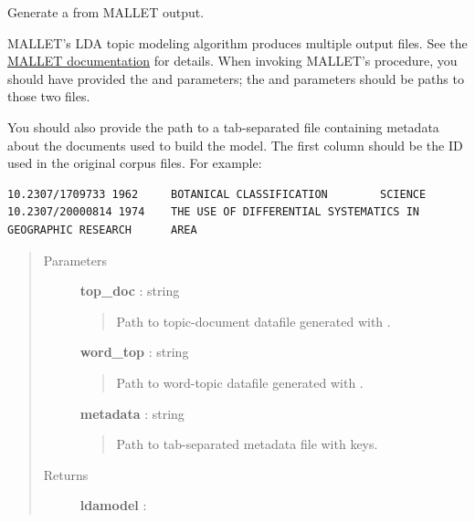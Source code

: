 \documentclass[letterpaper,10pt,english]{sphinxmanual}
\begin{document}
\begin{fulllineitems}
\label{tethne.model.corpus.ldamodel:tethne.model.corpus.ldamodel.from_mallet}
Generate a {\hyperref[tethne.model.corpus.ldamodel:tethne.model.corpus.ldamodel.LDAModel]{}} from MALLET output.

MALLET's LDA topic modeling algorithm produces multiple output files. See
the \href{http://mallet.cs.umass.edu/topics.php}{MALLET documentation} for
details. When invoking MALLET's  procedure, you should
have provided the  and 
parameters; the  and  parameters should be paths
to those two files.

You should also provide the path  to a tab-separated file 
containing metadata about the documents used to build the model. The first
column should be the ID used in the original corpus files. For example:

\begin{Verbatim}[commandchars=\\\{\}]
10.2307/1709733 1962     BOTANICAL CLASSIFICATION        SCIENCE
10.2307/20000814 1974    THE USE OF DIFFERENTIAL SYSTEMATICS IN GEOGRAPHIC RESEARCH      AREA
\end{Verbatim}
\begin{quote}\begin{description}
\item[{Parameters}] \leavevmode
\textbf{top\_doc} : string
\begin{quote}

Path to topic-document datafile generated with .
\end{quote}

\textbf{word\_top} : string
\begin{quote}

Path to word-topic datafile generated with .
\end{quote}

\textbf{metadata} : string
\begin{quote}

Path to tab-separated metadata file with {\hyperref[tethne.classes.paper:tethne.classes.paper.Paper]{}} keys.
\end{quote}

\item[{Returns}] \leavevmode
\textbf{ldamodel} : {\hyperref[tethne.model.corpus.ldamodel:tethne.model.corpus.ldamodel.LDAModel]{}}

\end{description}\end{quote}

\end{fulllineitems}
\end{document}
